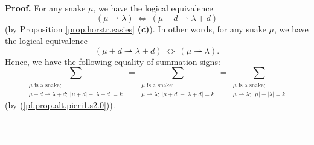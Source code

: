 \documentclass[numbers=enddot,12pt,final,onecolumn,notitlepage]{scrartcl}%
\theoremstyle{definition}
\newenvironment{proof}[1][Proof]{\noindent\textbf{#1.} }{\ \rule{0.5em}{0.5em}}
\let\sumnonlimits\sum
\renewcommand{\sum}{\sumnonlimits\limits}
\begin{document}
\begin{proof}
For any snake $\mu$, we have the logical equivalence%
\[
\left(  \mu\rightharpoonup\lambda\right)  \ \Longleftrightarrow\ \left(
\mu+d\rightharpoonup\lambda+d\right)
\]
(by Proposition \ref{prop.horstr.easies} \textbf{(c)}). In other words, for
any snake $\mu$, we have the logical equivalence%
\[
\left(  \mu+d\rightharpoonup\lambda+d\right)  \ \Longleftrightarrow\ \left(
\mu\rightharpoonup\lambda\right)  .
\]
Hence, we have the following equality of summation signs:%
\begin{equation}
\sum_{\substack{\mu\text{ is a snake;}\\\mu+d\rightharpoonup\lambda
+d;\ \left\vert \mu+d\right\vert -\left\vert \lambda+d\right\vert =k}%
}=\sum_{\substack{\mu\text{ is a snake;}\\\mu\rightharpoonup\lambda
;\ \left\vert \mu+d\right\vert -\left\vert \lambda+d\right\vert =k}%
}=\sum_{\substack{\mu\text{ is a snake;}\\\mu\rightharpoonup\lambda
;\ \left\vert \mu\right\vert -\left\vert \lambda\right\vert =k}}
\label{pf.prop.alt.pieri1.s2.sumeq}%
\end{equation}
(by (\ref{pf.prop.alt.pieri1.s2.0})).


\end{proof}
\end{document}
